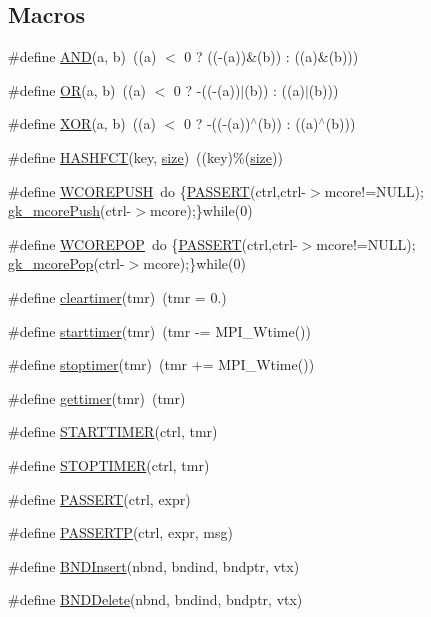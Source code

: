 \subsection*{Macros}
\begin{DoxyCompactItemize}
\item 
\#define \hyperlink{a00924_a51db6ba85772031b0a49ab3b1e46fc87}{A\+ND}(a,  b)~((a) $<$ 0 ? ((-\/(a))\&(b)) \+: ((a)\&(b)))
\item 
\#define \hyperlink{a00924_af69441c33563ebe0eb0312939509bba3}{OR}(a,  b)~((a) $<$ 0 ? -\/((-\/(a))$\vert$(b)) \+: ((a)$\vert$(b)))
\item 
\#define \hyperlink{a00924_af68c93838d750937b129e406f849ed94}{X\+OR}(a,  b)~((a) $<$ 0 ? -\/((-\/(a))$^\wedge$(b)) \+: ((a)$^\wedge$(b)))
\item 
\#define \hyperlink{a00924_aad4ca8af06a4e7cde40c07e0d3f0e17a}{H\+A\+S\+H\+F\+CT}(key,  \hyperlink{a00611_ad6cb0afbbe6ea4f56407890be2533966}{size})~((key)\%(\hyperlink{a00611_ad6cb0afbbe6ea4f56407890be2533966}{size}))
\item 
\#define \hyperlink{a00924_a76445c109da4a1f7bdf538f71922446b}{W\+C\+O\+R\+E\+P\+U\+SH}~do \{\hyperlink{a00924_a9702c21c10bbf405ed280d84651f379b}{P\+A\+S\+S\+E\+RT}(ctrl,ctrl-\/$>$mcore!=N\+U\+LL); \hyperlink{a00107_a07579694837248c1f2908860edc643c0}{gk\+\_\+mcore\+Push}(ctrl-\/$>$mcore);\}while(0)
\item 
\#define \hyperlink{a00924_a213331e15c4859c51ae85a9f45dc4403}{W\+C\+O\+R\+E\+P\+OP}~do \{\hyperlink{a00924_a9702c21c10bbf405ed280d84651f379b}{P\+A\+S\+S\+E\+RT}(ctrl,ctrl-\/$>$mcore!=N\+U\+LL); \hyperlink{a00107_ac7b3189a2be11b6736dc4c27d3d30f3a}{gk\+\_\+mcore\+Pop}(ctrl-\/$>$mcore);\}while(0)
\item 
\#define \hyperlink{a00924_aa7425aa3c84bbb11bf4f0aead48dd15a}{cleartimer}(tmr)~(tmr = 0.)
\item 
\#define \hyperlink{a00924_ae152c218f682104fbe90b42318765caf}{starttimer}(tmr)~(tmr -\/= M\+P\+I\+\_\+\+Wtime())
\item 
\#define \hyperlink{a00924_a5201dfe38edd7089e892384c62267802}{stoptimer}(tmr)~(tmr += M\+P\+I\+\_\+\+Wtime())
\item 
\#define \hyperlink{a00924_a51041a3e56cadadaf4ab510451363daa}{gettimer}(tmr)~(tmr)
\item 
\#define \hyperlink{a00924_a8ebbce945d4e224ebce93e9038376ef3}{S\+T\+A\+R\+T\+T\+I\+M\+ER}(ctrl,  tmr)
\item 
\#define \hyperlink{a00924_ac283007da12d7cee4bc94d545f4700f5}{S\+T\+O\+P\+T\+I\+M\+ER}(ctrl,  tmr)
\item 
\#define \hyperlink{a00924_a9702c21c10bbf405ed280d84651f379b}{P\+A\+S\+S\+E\+RT}(ctrl,  expr)
\item 
\#define \hyperlink{a00924_a1c9bd3e7cf4a336b473269eece968ab2}{P\+A\+S\+S\+E\+R\+TP}(ctrl,  expr,  msg)
\item 
\#define \hyperlink{a00924_a3e31d128b80999f03f99b89c706e3756}{B\+N\+D\+Insert}(nbnd,  bndind,  bndptr,  vtx)
\item 
\#define \hyperlink{a00924_a50c0ec343fb393d7e2334d15a2d22003}{B\+N\+D\+Delete}(nbnd,  bndind,  bndptr,  vtx)
\end{DoxyCompactItemize}


